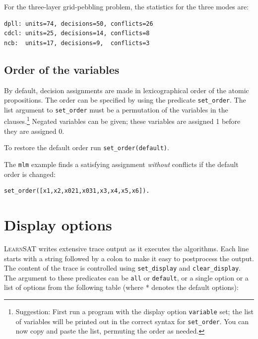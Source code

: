 \documentclass[11pt]{article}
\newcommand*{\p}[1]{\textup{\texttt{#1}}}
\newcommand*{\ls}{\textsc{LearnSAT}}
\begin{document}
For the three-layer grid-pebbling problem, the statistics for the three
modes are:
\begin{verbatim}
dpll: units=74, decisions=50, conflicts=26
cdcl: units=25, decisions=14, conflicts=8
ncb:  units=17, decisions=9,  conflicts=3
\end{verbatim}

\subsection{Order of the variables}

By default, decision assignments are made in lexicographical order of
the atomic propositions. The order can be specified by using the
predicate \p{set\_order}. The list argument to \p{set\_order} must be a
permutation of the variables in the clauses.\footnote{Suggestion: First
run a program with the display option \p{variable} set; the list of
variables will be printed out in the correct syntax for \p{set\_order}.
You can now copy and paste the list, permuting the order as needed.}
Negated variables can be given; these variables are assigned 1 before
they are assigned 0.

To restore the default order run \p{set\_order(default)}.

The \p{mlm} example finds a satisfying assignment \emph{without}
conflicts if the default order is changed:

\begin{verbatim}
set_order([x1,x2,x021,x031,x3,x4,x5,x6]).
\end{verbatim}


\section{Display options}

\ls{} writes extensive trace output as it executes the algorithms. Each
line starts with a string followed by a colon to make it easy to
postprocess the output. The content of the trace is controlled using
\p{set\_display} and \p{clear\_display}. The argument to these
predicates can be \p{all} or \p{default}, or a single option or a list
of options from the following table (where * denotes the default
options):
\end{document}
